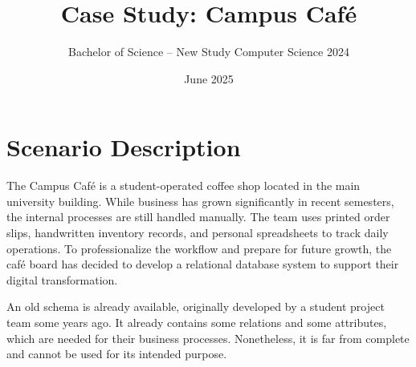 \documentclass[a4paper,12pt]{article}
\title{Case Study: Campus Café}
\author{Bachelor of Science – New Study Computer Science 2024}
\date{June 2025}
\begin{document}
\maketitle

\section{Scenario Description}

The Campus Café is a student-operated coffee shop located in the main university building. While business has grown significantly in recent semesters, the internal processes are still handled manually. The team uses printed order slips, handwritten inventory records, and personal spreadsheets to track daily operations. To professionalize the workflow and prepare for future growth, the café board has decided to develop a relational database system to support their digital transformation.

An old schema is already available, originally developed by a student project team some years ago. It already contains some relations and some attributes, which are needed for their business processes. Nonetheless, it is far from complete and cannot be used for its intended purpose.

\newpage


\newpage


\newpage


\newpage

\end{document}
